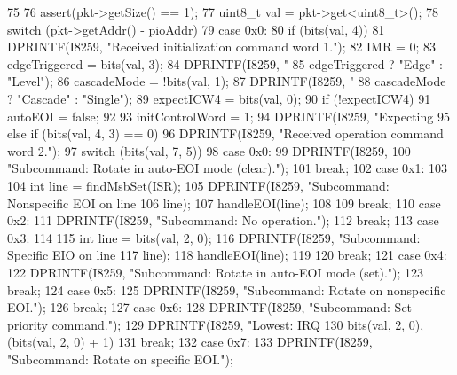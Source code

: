 \begin{DoxyCode}
75 {
76     assert(pkt->getSize() == 1);
77     uint8_t val = pkt->get<uint8_t>();
78     switch (pkt->getAddr() - pioAddr) {
79       case 0x0:
80         if (bits(val, 4)) {
81             DPRINTF(I8259, "Received initialization command word 1.\n");
82             IMR = 0;
83             edgeTriggered = bits(val, 3);
84             DPRINTF(I8259, "%
85                     edgeTriggered ? "Edge" : "Level");
86             cascadeMode = !bits(val, 1);
87             DPRINTF(I8259, "%
88                     cascadeMode ? "Cascade" : "Single");
89             expectICW4 = bits(val, 0);
90             if (!expectICW4) {
91                 autoEOI = false;
92             }
93             initControlWord = 1;
94             DPRINTF(I8259, "Expecting %
95         } else if (bits(val, 4, 3) == 0) {
96             DPRINTF(I8259, "Received operation command word 2.\n");
97             switch (bits(val, 7, 5)) {
98               case 0x0:
99                 DPRINTF(I8259,
100                         "Subcommand: Rotate in auto-EOI mode (clear).\n");
101                 break;
102               case 0x1:
103                 {
104                     int line = findMsbSet(ISR);
105                     DPRINTF(I8259, "Subcommand: Nonspecific EOI on line %
106                             line);
107                     handleEOI(line);
108                 }
109                 break;
110               case 0x2:
111                 DPRINTF(I8259, "Subcommand: No operation.\n");
112                 break;
113               case 0x3:
114                 {
115                     int line = bits(val, 2, 0);
116                     DPRINTF(I8259, "Subcommand: Specific EIO on line %
117                             line);
118                     handleEOI(line);
119                 }
120                 break;
121               case 0x4:
122                 DPRINTF(I8259, "Subcommand: Rotate in auto-EOI mode (set).\n");
123                 break;
124               case 0x5:
125                 DPRINTF(I8259, "Subcommand: Rotate on nonspecific EOI.\n");
126                 break;
127               case 0x6:
128                 DPRINTF(I8259, "Subcommand: Set priority command.\n");
129                 DPRINTF(I8259, "Lowest: IRQ%
130                         bits(val, 2, 0), (bits(val, 2, 0) + 1) %
131                 break;
132               case 0x7:
133                 DPRINTF(I8259, "Subcommand: Rotate on specific EOI.\n");
}}}}
\end{DoxyCode}
